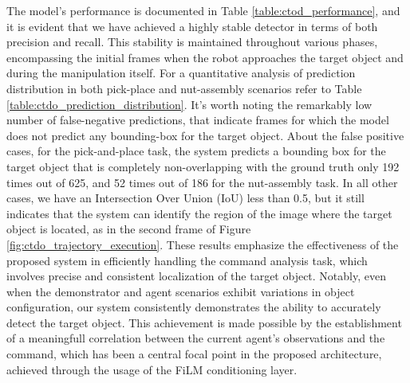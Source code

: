 The model's performance is documented in Table \ref{table:ctod_performance}, and it is evident that we have achieved a highly stable detector in terms of both precision and recall. This stability is maintained throughout various phases, encompassing the initial frames when the robot approaches the target object and during the manipulation itself. For a quantitative analysis of prediction distribution in both pick-place and nut-assembly scenarios refer to Table \ref{table:ctdo_prediction_distribution}. It's worth noting the remarkably low number of false-negative predictions, that indicate frames for which the model does not predict any bounding-box for the target object. About the false positive cases, for the pick-and-place task, the system predicts a bounding box for the target object that is completely non-overlapping with the ground truth only 192 times out of 625, and 52 times out of 186 for the nut-assembly task. In all other cases, we have an Intersection Over Union (IoU) less than 0.5, but it still indicates that the system can identify the region of the image where the target object is located, as in the second frame of Figure \ref{fig:ctdo_trajectory_execution}. These results emphasize the effectiveness of the proposed system in efficiently handling the command analysis task, which involves precise and consistent localization of the target object. Notably, even when the demonstrator and agent scenarios exhibit variations in object configuration, our system consistently demonstrates the ability to accurately detect the target object. This achievement is made possible by the establishment of a meaningfull correlation between the current agent's observations and the command, which has been a central focal point in the proposed architecture, achieved through the usage of the FiLM conditioning layer.


